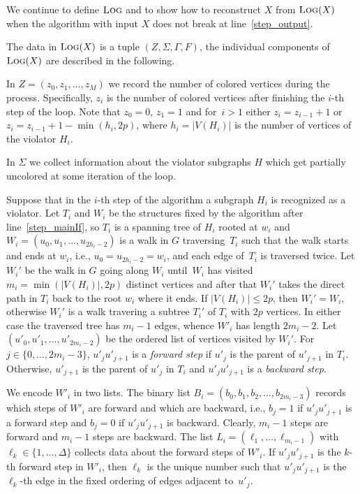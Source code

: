 We continue to define $\text{\scshape Log}$ and to show how to reconstruct $X$ from $\text{\scshape Log}(X)$
when the algorithm with input $X$ does not break at line~\ref{step_output}.

The data in $\text{\scshape Log}(X)$ is a tuple $(Z,\Sigma,\Gamma,F)$,
the individual components of  $\text{\scshape Log}(X)$ are described in the following.

In $Z=(z_0,z_1,\ldots,z_M)$ we record the number
of colored vertices during the process.
Specifically,
$z_i$ is the number of colored vertices after 
finishing the $i$-th step of the loop.
Note that $z_0=0$, $z_1=1$ and for~$i>1$
either $z_i = z_{i-1}+1$ or $z_i = z_{i-1}+1 - \min(h_i,2p)$, where
$h_i = |V(H_i)|$ is the number of vertices of the 
violator $H_i$. 

In $\Sigma$ we collect information about the violator subgraphs $H$
which get partially uncolored at some iteration of the loop.  

Suppose that in the $i$-th step of the algorithm a subgraph $H_i$ 
is recognized as a violator.
Let $T_i$ and $W_i$ be the structures fixed by the algorithm after line~\ref{step_mainIf},
so $T_i$ is a spanning tree of $H_i$ rooted at $w_i$ and 
$W_i=(u_0,u_1,\ldots,u_{2h_i-2})$ is a walk in $G$ traversing~$T_i$ such that 
the walk starts and ends at $w_i$, i.e., $u_0=u_{2h_i-2}=w_i$, and
each edge of~$T_i$ is traversed twice.
Let $W_i'$ be the walk in $G$ going along $W_i$ until~$W_i$ has visited
$m_i=\min(|V(H_i)|,2p)$ distinct vertices and after that $W_i'$
takes the direct path in $T_i$ back to the root $w_i$ where it ends.
If $|V(H_i)| \leq 2p$, then $W_i'= W_i$, otherwise $W_i'$ is a walk
travering a subtree $T_i'$ of $T_i$ with $2p$ vertices. In either case
the traversed tree has $m_i-1$ edges, whence $W'_i$ has length $2m_i-2$.
Let $(u'_0,u'_1,\ldots,u'_{2m_i-2})$ be the ordered list of vertices
visited by $W_i'$.
For $j\in\{0,\ldots,2m_i-3\}$, $u'_ju'_{j+1}$ is a \emph{forward step} 
if $u'_j$ is the parent of $u'_{j+1}$ in $T_i$.
Otherwise, $u'_{j+1}$ is the parent of $u'_j$ in $T_i$ and $u'_ju'_{j+1}$ 
is a \emph{backward step}.


We encode $W'_i$ in two lists.  The binary list
$B_i=(b_0,b_1,b_2,\ldots,b_{2m_i-3})$ records which steps of $W'_i$ are
forward and which are backward, i.e., $b_j=1$ if $u'_ju'_{j+1}$ is a forward
step and $b_j=0$ if $u'_ju'_{j+1}$ is backward.  Clearly, $m_i-1$ steps are
forward and $m_i-1$ steps are backward.  The list
$L_i=(\ell_1,\ldots,\ell_{m_i-1})$ with $\ell_k\in\{1,\ldots,\Delta\}$
collects data about the forward steps of $W'_i$.  If $u'_ju'_{j+1}$ is the
$k$-th forward step in $W'_i$, then $\ell_k$ is the unique number such that
$u'_ju'_{j+1}$ is the $\ell_k$-th edge in the fixed ordering of edges adjacent
to~$u'_j$.


